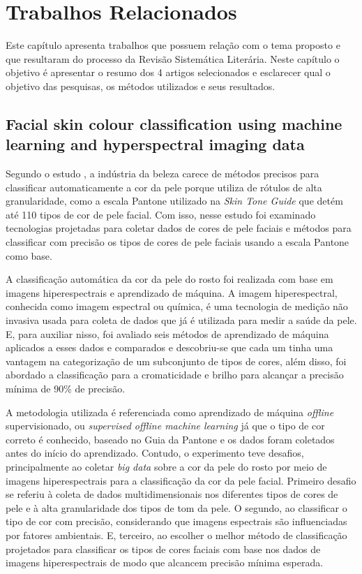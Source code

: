 \chapter{Trabalhos Relacionados}
\label{cap:trabalhos-relacionados}
Este capítulo apresenta trabalhos que possuem relação com o tema proposto e que resultaram do processo da Revisão Sistemática Literária. Neste capítulo o objetivo é apresentar o resumo dos 4 artigos selecionados e esclarecer qual o objetivo das pesquisas, os métodos utilizados e seus resultados.

\section{Facial skin colour classification using machine learning and hyperspectral imaging data} 
 Segundo o estudo \cite{Facial_skin_colour_classification_using_machine_learning_and_hyperspectral_imaging_data}, a indústria da beleza carece de métodos precisos para classificar automaticamente a cor da pele porque utiliza de rótulos de alta granularidade, como a escala Pantone utilizado na \textit{Skin Tone Guide} que detém até 110 tipos de cor de pele facial. Com isso, nesse estudo foi examinado tecnologias projetadas para coletar dados de cores de pele faciais e métodos para classificar com precisão os tipos de cores de pele faciais usando a escala Pantone como base.

A classificação automática da cor da pele do rosto foi realizada com base em imagens hiperespectrais e aprendizado de máquina.  A imagem hiperespectral, conhecida como imagem espectral ou química, é uma tecnologia de medição não invasiva usada para coleta de dados que já é utilizada para medir a saúde da pele. E, para auxiliar nisso, foi avaliado seis métodos de aprendizado de máquina aplicados a esses dados e comparados e descobriu-se que cada um tinha uma vantagem na categorização de um subconjunto de tipos de cores, além disso, foi abordado a classificação para a cromaticidade e brilho para alcançar a precisão mínima de 90\% de precisão.

A metodologia utilizada é referenciada como aprendizado de máquina \textit{offline} supervisionado, ou \textit{supervised offline machine learning} já que o tipo de cor correto é conhecido, baseado no Guia da Pantone e os dados foram coletados antes do início do aprendizado. Contudo, o experimento teve desafios, principalmente ao  coletar \textit{big data} sobre a cor da pele do rosto por meio de imagens hiperespectrais para a classificação da cor da pele facial.  Primeiro desafio se referiu à coleta de dados multidimensionais nos diferentes tipos de cores de pele e à alta granularidade dos tipos de tom da pele. O segundo, ao classificar o tipo de cor com precisão, considerando que imagens espectrais são influenciadas por fatores ambientais. E, terceiro, ao escolher o melhor método de classificação projetados para classificar os tipos de cores faciais com base nos dados de imagens hiperespectrais de modo que alcancem precisão mínima esperada.

